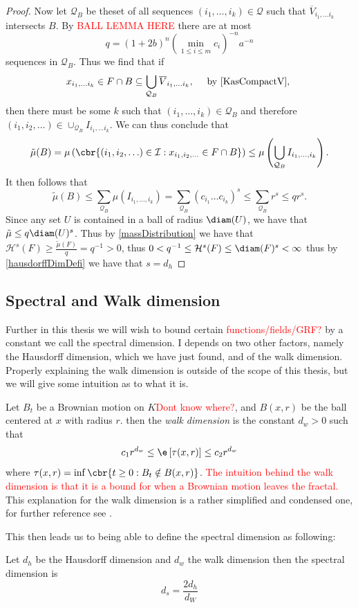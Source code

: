 \begin{proof}
	Now let $\mathcal{Q}_{B}$ be theset of all sequences $(i_1, \ldots, i_k) \in \mathcal{Q}$ such that $\overline{V}_{i_1, \ldots i_k}$ intersects $B$. By \textcolor{red}{BALL LEMMA HERE} there are at most
	$$q = (1+2b)^{n} \left(\min_{1\leq i \leq m} c_i\right)^{-n} a^{-n}$$
	sequences in $\mathcal{Q}_{B}$. Thus we find that if
	\begin{equation}
		x_{i_1, \ldots i_k} \in F \cap B \subseteq \bigcup_{\mathcal{Q}_{B}} \overline{V}_{i_1, \ldots i_k}, \quad \text{ by \eqref{KasCompactV}, }
	\end{equation}
	then there must be some $k$ such that $(i_1, \ldots, i_k) \in \mathcal{Q}_{B}$ and therefore $(i_1, i_2, \ldots) \in \cup_{\mathcal{Q}_{B}} I_{i_1, \ldots i_k}$. We can thus conclude that
	\begin{equation}
		\tilde{\mu}(B) = \mu \left(\cbr{(i_1, i_2, \ldots) \in \mathcal{I} : x_{i_1, i_2, \ldots} \in F \cap B}\right) \leq \mu \left(\bigcup_{\mathcal{Q}_{B}} I_{i_1, \ldots, i_k}\right).
	\end{equation}
	It then follows that
	\begin{equation}
		\tilde{\mu}(B) \leq \sum_{\mathcal{Q}_{B}} \mu\left(I_{i_1, \ldots, i_k}\right) = \sum_{\mathcal{Q}_{B}} \left(c_{i_1} \dots c_{i_k}\right)^{s} \leq \sum_{\mathcal{Q}_{B}} r^{s} \leq qr^{s}.
	\end{equation}
	Since any set $U$ is contained in a ball of radius $\diam(U)$, we have that $\tilde{\mu} \leq q \diam(U)^{s}$. Thus by \cref{massDistribution} we have that $\mathcal{H}^{s}(F) \geq \frac{\tilde{\mu}(F)}{q} = q^{-1} > 0$, thus $0 < q^{-1} \leq \mathcal{H}^{s}(F) \leq \diam(F)^{s} < \infty$ thus by \cref{hausdorffDimDefi} we have that $s = d_h$
\end{proof}

\subsection{Spectral and Walk dimension}
Further in this thesis we will wish to bound certain \textcolor{red}{functions/fields/GRF?} by a constant we call the spectral dimension. I depends on two other factors, namely the Hausdorff dimension, which we have just found, and of the walk dimension. Properly explaining the walk dimension is outside of the scope of this thesis, but we will give some intuition as to what it is.

Let $B_t$ be a Brownian motion on $K$\textcolor{red}{Dont know where?}, and $B(x,r)$ be the ball centered at $x$ with radius $r$. then the \emph{walk dimension} is the constant $d_w > 0$ such that
\begin{equation}
	c_1 r^{d_w} \leq \e \left[\tau(x,r)\right] \leq c_2 r^{d_w}
\end{equation}
where $\tau(x,r) = \inf\cbr{t \geq 0 : B_t \notin B(x,r)}$. \textcolor{red}{The intuition behind the walk dimension is that it is a bound for when a Brownian motion leaves the fractal.} This explanation for the walk dimension is a rather simplified and condensed one, for further reference see \cite[Chapter 3]{barlow}.


This then leads us to being able to define the spectral dimension as following:
\begin{defi}\label{spectralDimDefi}
	Let $d_h$ be the Hausdorff dimension and $d_w$ the walk dimension then the spectral dimension is
	\begin{equation}
		d_s = \frac{2 d_h}{d_W}
	\end{equation}
\end{defi}